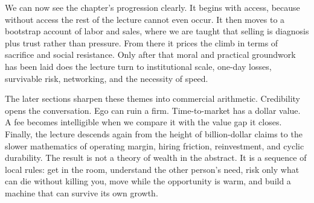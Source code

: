 We can now see the chapter's progression clearly. It begins with access, because without access the rest of the lecture cannot even occur. It then moves to a bootstrap account of labor and sales, where we are taught that selling is diagnosis plus trust rather than pressure. From there it prices the climb in terms of sacrifice and social resistance. Only after that moral and practical groundwork has been laid does the lecture turn to institutional scale, one-day losses, survivable risk, networking, and the necessity of speed.

The later sections sharpen these themes into commercial arithmetic. Credibility opens the conversation. Ego can ruin a firm. Time-to-market has a dollar value. A fee becomes intelligible when we compare it with the value gap it closes. Finally, the lecture descends again from the height of billion-dollar claims to the slower mathematics of operating margin, hiring friction, reinvestment, and cyclic durability. The result is not a theory of wealth in the abstract. It is a sequence of local rules: get in the room, understand the other person's need, risk only what can die without killing you, move while the opportunity is warm, and build a machine that can survive its own growth.